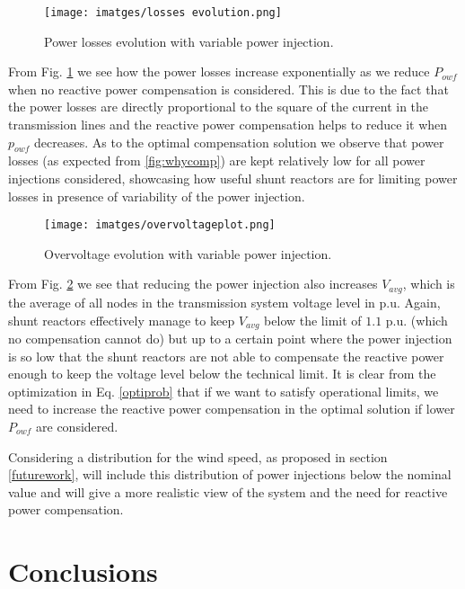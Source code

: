 \documentclass[a4paper,11pt, titlepage, twoside]{article}
\begin{document}
\begin{figure}[H]
    \centering
    \texttt{[image: imatges/losses evolution.png]}
    \caption{Power losses evolution with variable power injection.}
    \label{fig:lossesevol}
\end{figure}

From Fig. \ref{fig:lossesevol} we see how the power losses increase exponentially as we reduce $P_{owf}$ when no reactive power
compensation is considered. This is due to the fact that the power losses are directly proportional to the square of the current in the transmission lines and the reactive power compensation helps to reduce it when $p_{owf}$ decreases.
As to the optimal compensation solution we observe that power losses (as expected from \ref{fig:whycomp}) are kept relatively low for all power injections considered, showcasing how useful shunt reactors are for limiting power losses in presence of variability of
the power injection.
\begin{figure}[H]
    \centering
    \texttt{[image: imatges/overvoltageplot.png]}
    \caption{Overvoltage evolution with variable power injection.}
    \label{fig:overvoltevol}
\end{figure}

From Fig. \ref{fig:overvoltevol} we see that reducing the power injection also increases $V_{avg}$, which is the average of all nodes in the transmission system voltage level in p.u. Again, shunt reactors effectively manage to keep $V_{avg}$ below the limit of $1.1$ p.u. (which no compensation cannot do) but up to a certain point where the power injection is so low that the shunt reactors are not able to compensate the reactive power enough to keep the voltage level below the technical limit. It
is clear from the optimization in Eq. \ref{optiprob} that if we want to satisfy operational limits, we need to increase the reactive power compensation in the optimal solution if lower $P_{owf}$ are considered.

Considering a distribution for the wind speed, as proposed in section \ref{futurework}, will include this distribution of power injections below the nominal value and will give a more realistic view of the system and the need for reactive power compensation.


\section{Conclusions}\label{Conclusions}
\end{document}

